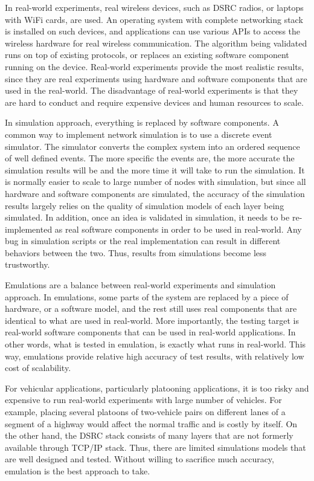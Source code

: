 \documentclass[12pt]{report}
\begin{document}
In real-world experiments, real wireless devices, such as DSRC radios, or laptops with WiFi cards, are used. An operating system with complete networking stack is installed on such devices, and applications can use various APIs to access the wireless hardware for real wireless communication. The algorithm being validated runs on top of existing protocols, or replaces an existing software component running on the device. Real-world experiments provide the most realistic results, since they are real experiments using hardware and software components that are used in the real-world. The disadvantage of real-world experiments is that they are hard to conduct and require expensive devices and human resources to scale.

In simulation approach, everything is replaced by software components. A common way to implement network simulation is to use a discrete event simulator. The simulator converts the complex system into an ordered sequence of well defined events. The more specific the events are, the more accurate the simulation results will be and the more time it will take to run the simulation. It is normally easier to scale to large number of nodes with simulation, but since all hardware and software components are simulated, the accuracy of the simulation results largely relies on the quality of simulation models of each layer being simulated. In addition, once an idea is validated in simulation, it needs to be re-implemented as real software components in order to be used in real-world. Any bug in simulation scripts or the real implementation can result in different behaviors between the two. Thus, results from simulations become less trustworthy.

Emulations are a balance between real-world experiments and simulation approach. In emulations, some parts of the system are replaced by a piece of hardware, or a software model, and the rest still uses real components that are identical to what are used in real-world. More importantly, the testing target is real-world software components that can be used in real-world applications. In other words, what is tested in emulation, is exactly what runs in real-world. This way, emulations provide relative high accuracy of test results, with relatively low cost of scalability.

For vehicular applications, particularly platooning applications, it is too risky and expensive to run real-world experiments with large number of vehicles. For example, placing several platoons of two-vehicle pairs on different lanes of a segment of a highway would affect the normal traffic and is costly by itself. On the other hand, the DSRC stack consists of many layers that are not formerly available through TCP/IP stack. Thus, there are limited simulations models that are well designed and tested. Without willing to sacrifice much accuracy, emulation is the best approach to take.
\end{document}
